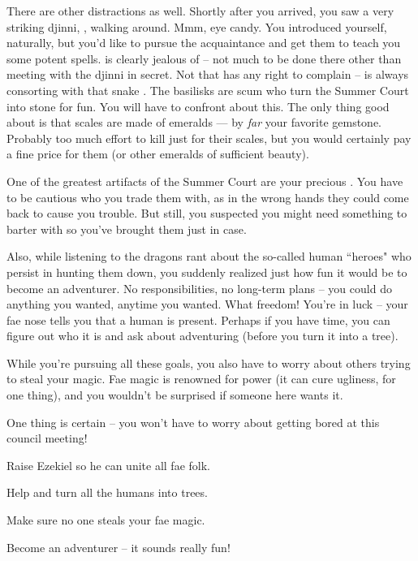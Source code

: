 \documentclass[char]{guildcamp2}
\begin{document}
There are other distractions as well.  Shortly after you arrived, you saw a very striking djinni, \cWizard{}, walking around.  Mmm, eye candy.  You introduced yourself, naturally, but you'd like to pursue the acquaintance and get them to teach you some potent spells. \cBabyFae{} is clearly jealous of \cWizard{} -- not much to be done there other than meeting with the djinni in secret. Not that \cBabyFae{} has any right to complain -- \cBabyFae{\they} is always consorting with that snake \cBasilisk{}. The basilisks are scum who turn the Summer Court into stone for fun. You will have to confront \cBabyFae{} about this. The only thing good about \cBasilisk{} is that \cBasilisk{\their} scales are made of emeralds --- by \emph{far} your favorite gemstone. Probably too much effort to kill \cBasilisk{} just for their scales, but you would certainly pay a fine price for them (or other emeralds of sufficient beauty).

One of the greatest artifacts of the Summer Court are your precious \iDaywalkerFruit{}. You have to be cautious who you trade them with, as in the wrong hands they could come back to cause you trouble. But still, you suspected you might need something to barter with so you've brought them just in case.

Also, while listening to the dragons rant about the so-called human ``heroes" who persist in hunting them down, you suddenly realized just how fun it would be to become an adventurer.  No responsibilities, no long-term plans -- you could do anything you wanted, anytime you wanted.  What freedom!  You're in luck -- your fae nose tells you that a human is present.  Perhaps if you have time, you can figure out who it is and ask about adventuring (before you turn it into a tree).  

While you're pursuing all these goals, you also have to worry about others trying to steal your magic.  Fae magic is renowned for power (it can cure ugliness, for one thing), and you wouldn't be surprised if someone here wants it.

One thing is certain -- you won't have to worry about getting bored at this council meeting!

 
\begin{itemz}[Goals]
  \item Raise Ezekiel so he can unite all fae folk.
  \item Help \cEnt{\intro} and \cTroll{\intro} turn all the humans into trees.
  \item Make sure no one steals your fae magic.
  \item Become an adventurer -- it sounds really fun!
\end{itemz}
\end{document}
